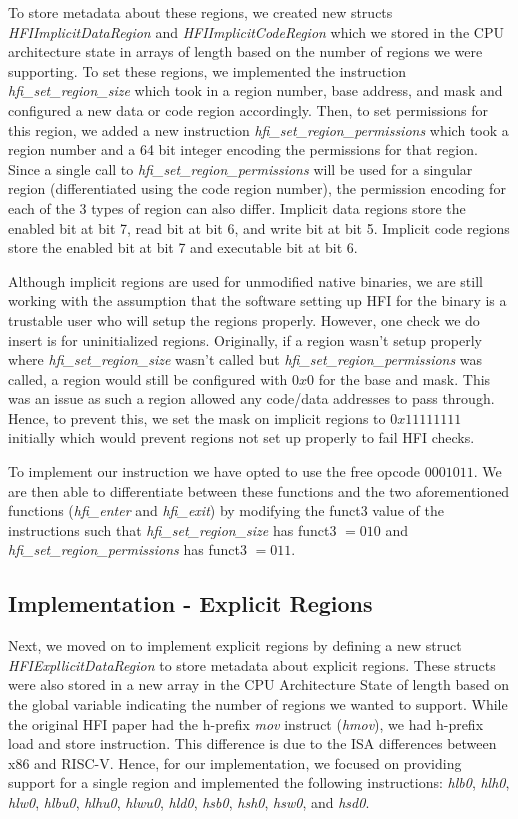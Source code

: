 \documentclass[conference,compsoc]{IEEEtran}
\begin{document}
To store metadata about these regions, we created new structs \textit{HFIImplicitDataRegion} and \textit{HFIImplicitCodeRegion} which we stored in the CPU architecture state in arrays of length based on the number of regions we were supporting. To set these regions, we implemented the instruction \textit{hfi\_set\_region\_size} which took in a region number, base address, and mask and configured a new data or code region accordingly. Then, to set permissions for this region, we added a new instruction \textit{hfi\_set\_region\_permissions} which took a region number and a 64 bit integer encoding the permissions for that region. Since a single call to \textit{hfi\_set\_region\_permissions} will be used for a singular region (differentiated using the code region number), the permission encoding for each of the 3 types of region can also differ. Implicit data regions store the enabled bit at bit 7, read bit at bit 6, and write bit at bit 5. Implicit code regions store the enabled bit at bit 7 and executable bit at bit 6.

Although implicit regions are used for unmodified native binaries, we are still working with the assumption that the software setting up HFI for the binary is a trustable user who will setup the regions properly. However, one check we do insert is for uninitialized regions. Originally, if a region wasn't setup properly where \textit{hfi\_set\_region\_size} wasn't called but \textit{hfi\_set\_region\_permissions} was called, a region would still be configured with $0x0$ for the base and mask. This was an issue as such a region allowed any code/data addresses to pass through. Hence, to prevent this, we set the mask on implicit regions to $0x11111111$ initially which would prevent regions not set up properly to fail HFI checks.

To implement our instruction we have opted to use the free opcode $0001011$.
We are then able to differentiate between these functions and the two aforementioned functions (\textit{hfi\_enter} and \textit{hfi\_exit}) by modifying the funct3 value of the instructions such that \textit{hfi\_set\_region\_size} has funct3 $= 010$ and \textit{hfi\_set\_region\_permissions} has funct3 $= 011$.

\subsection{Implementation - Explicit Regions}
Next, we moved on to implement explicit regions by defining a new struct \textit{HFIExpllicitDataRegion} to store metadata about explicit regions. These structs were also stored in a new array in the CPU Architecture State of length based on the global variable indicating the number of regions we wanted to support. While the original HFI paper had the h-prefix \textit{mov} instruct (\textit{hmov}), we had h-prefix load and store instruction. This difference is due to the ISA differences between x86 and RISC-V. Hence, for our implementation, we focused on providing support for a single region and implemented the following instructions: \textit{hlb0}, \textit{hlh0}, \textit{hlw0}, \textit{hlbu0}, \textit{hlhu0}, \textit{hlwu0}, \textit{hld0}, \textit{hsb0}, \textit{hsh0}, \textit{hsw0}, and \textit{hsd0}.
\end{document}
